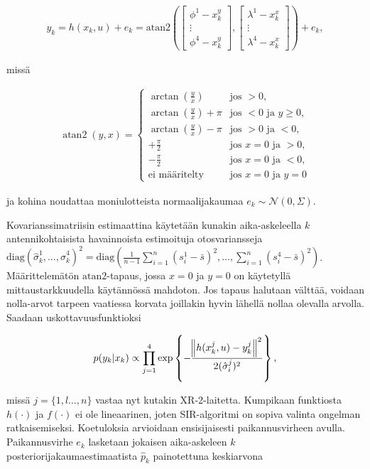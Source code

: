 \documentclass[
  12pt,
  a4paper, twoside]{book}
\begin{document}
\begin{align}\label{havaintomalli}
y_k=h(x_k, u)+e_k=\text{atan2}(\begin{bmatrix}\phi^1-x_k^y\\ \vdots \\ \phi^4-x_k^y\end{bmatrix}, \begin{bmatrix}\lambda^1-x_k^x\\ \vdots \\ \lambda^4-x_k^x\end{bmatrix})+e_k,
\end{align}

\noindent missä

\begin{align}\label{atan2}
\displaystyle \operatorname{atan2}(y,x)={\begin{cases}\arctan({\frac {y}{x}})&{\text{jos }}>0,\\\arctan({\frac {y}{x}})+\pi &{\text{jos }}<0{\text{ ja }}y\geq 0,\\\arctan({\frac {y}{x}})-\pi & {\text{jos }}>0{\text{ ja }}<0,\\+{\frac {\pi }{2}}&{\text{jos }}x=0{\text{ ja }}>0,\\-{\frac {\pi }{2}}&{\text{jos }}x=0{\text{ ja }}<0,\\{\text{ei määritelty}}&{\text{jos }}x=0{\text{ ja }}y=0\end{cases}}
\end{align}

\noindent ja kohina noudattaa moniulotteista normaalijakaumaa \(e_k\sim\mathcal{N}(0,{\Sigma})\).

Kovarianssimatriisin estimaattina käytetään kunakin aika-askeleella \(k\) antennikohtaisista havainnoista estimoituja otosvariansseja \(\text{diag}(\hat{\sigma}^1_k,\ldots,\hat{\sigma}^4_k)^2=\text{diag}(\frac{1}{n-1}\sum_{i=1}^n(s_i^1-\bar{s})^2,\ldots,\sum_{i=1}^n(s_i^4-\bar{s})^2)\). Määrittelemätön \(\text{atan2}\)-tapaus, jossa \(x=0\) ja \(y=0\) on käytetyllä mittaustarkkuudella käytännössä mahdoton. Jos tapaus halutaan välttää, voidaan nolla-arvot tarpeen vaatiessa korvata joillakin hyvin lähellä nollaa olevalla arvolla. Saadaan uskottavuusfunktioksi

\begin{align}
p(y_k|x_k)\propto\prod_{j=1}^4\exp\left\{-\frac{\norm{h(x^j_k,u)-y^j_k}^2}{2(\hat{\sigma}_i^j)^2}\right\},
\end{align}

\noindent missä \(j=\{1,l\dots,n\}\) vastaa nyt kutakin XR-2-laitetta. Kumpikaan funktiosta \(h(\cdot)\) ja \(f(\cdot)\) ei ole lineaarinen, joten SIR-algoritmi on sopiva valinta ongelman ratkaisemiseksi. Koetuloksia arvioidaan ensisijaisesti paikannusvirheen avulla. Paikannusvirhe \(e_k\) lasketaan jokaisen aika-askeleen \(k\) posteriorijakaumaestimaatista \(\hat{p}_k\) painotettuna keskiarvona
\end{document}
